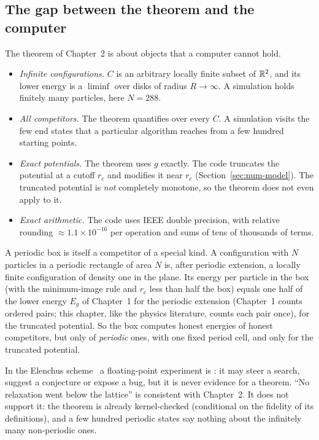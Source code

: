 \subsection{The gap between the theorem and the computer}
The theorem of Chapter~2 is about objects that a computer cannot hold.
\begin{itemize}
\item \emph{Infinite configurations.} $C$ is an arbitrary locally finite subset of $\mathbb{R}^2$, and its lower energy is a
$\liminf$ over disks of radius $R\to\infty$. A simulation holds finitely many particles, here $N=288$.
\item \emph{All competitors.} The theorem quantifies over every $C$. A simulation visits the few end states that a
particular algorithm reaches from a few hundred starting points.
\item \emph{Exact potentials.} The theorem uses $g$ exactly. The code truncates the potential at a cutoff $r_c$ and
modifies it near $r_c$ (Section~\ref{sec:num-model}). The truncated potential is \emph{not} completely monotone, so the
theorem does not even apply to it.
\item \emph{Exact arithmetic.} The code uses IEEE double precision, with relative rounding $\approx 1.1\times10^{-16}$ per
operation and sums of tens of thousands of terms.
\end{itemize}
A periodic box is itself a competitor of a special kind. A configuration with $N$ particles in a periodic rectangle
of area $N$ is, after periodic extension, a locally finite configuration of density one in the plane. Its energy per
particle in the box (with the minimum-image rule and $r_c$ less than half the box) equals one half of the lower energy
$E_g$ of Chapter~1 for the periodic extension (Chapter~1 counts ordered pairs; this chapter, like the physics
literature, counts each pair once), for the truncated potential. So the box computes honest energies of honest competitors, but only of
\emph{periodic} ones, with one fixed period cell, and only for the truncated potential.

\begin{warnbox}
In the Elenchus scheme~\cite{elenchus} a floating-point experiment is \tierX: it may steer a search, suggest a
conjecture or expose a bug, but it is never evidence for a theorem. ``No relaxation went below the lattice'' is
consistent with Chapter~2. It does not support it: the theorem is already kernel-checked (conditional on the fidelity
of its definitions), and a few hundred periodic states say nothing about the infinitely many non-periodic ones.
\end{warnbox}

